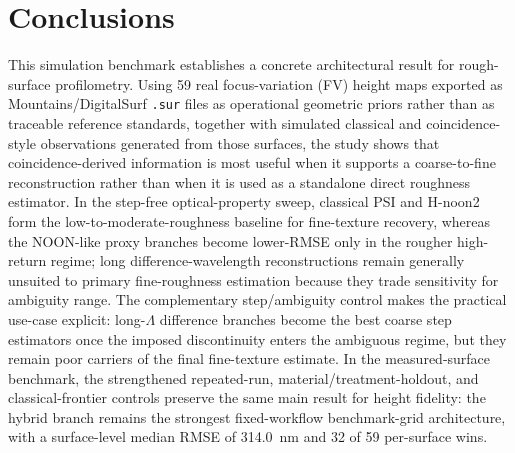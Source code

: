 \documentclass[photonics,article,submit,pdftex,moreauthors]{Definitions/mdpi}
\begin{document}
\section{Conclusions}
This simulation benchmark establishes a concrete architectural result for rough-surface profilometry. Using 59 real focus-variation (FV) height maps exported as Mountains/DigitalSurf \texttt{.sur} files as operational geometric priors rather than as traceable reference standards, together with simulated classical and coincidence-style observations generated from those surfaces, the study shows that coincidence-derived information is most useful when it supports a coarse-to-fine reconstruction rather than when it is used as a standalone direct roughness estimator. In the step-free optical-property sweep, classical PSI and H-noon2 form the low-to-moderate-roughness baseline for fine-texture recovery, whereas the NOON-like proxy branches become lower-RMSE only in the rougher high-return regime; long difference-wavelength reconstructions remain generally unsuited to primary fine-roughness estimation because they trade sensitivity for ambiguity range. The complementary step/ambiguity control makes the practical use-case explicit: long-$\Lambda$ difference branches become the best coarse step estimators once the imposed discontinuity enters the ambiguous regime, but they remain poor carriers of the final fine-texture estimate. In the measured-surface benchmark, the strengthened repeated-run, material/treatment-holdout, and classical-frontier controls preserve the same main result for height fidelity: the hybrid branch remains the strongest fixed-workflow benchmark-grid architecture, with a surface-level median RMSE of 314.0~nm and 32 of 59 per-surface wins.
\end{document}
